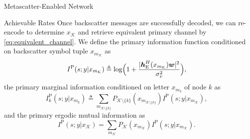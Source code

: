 \documentclass[journal]{IEEEtran}
\begin{document}
\begin{section}{Metascatter-Enabled Network}
\begin{subsection}{Achievable Rates}
		Once backscatter messages are successfully decoded, we can re-encode to determine $x_{\mathcal{K}}$ and retrieve equivalent primary channel by \eqref{eq:equivalent_channel}. We define the primary information function conditioned on backscatter symbol tuple $x_{m_{\mathcal{K}}}$ as
		\begin{equation}
			I^{\mathrm{P}}(s;y|x_{m_{\mathcal{K}}}) \triangleq \log \Bigl(1 + \frac{\lvert \boldsymbol{h}_{\mathrm{E}}^H(x_{m_{\mathcal{K}}}) \boldsymbol{w} \rvert^2}{\sigma_v^2}\Bigr),
			\label{eq:primary_information_function}
		\end{equation}
		the primary marginal information conditioned on letter $x_{m_k}$ of node $k$ as
		\begin{equation}
			I^{\mathrm{P}}_{k}(s;y|x_{m_k}) \triangleq \sum_{m_{\mathcal{K} \setminus \{k\}}} P_{\mathcal{K} \setminus \{k\}}(x_{m_{\mathcal{K} \setminus \{k\}}}) I^{\mathrm{P}}(s;y|x_{m_{\mathcal{K}}}),
			\label{eq:primary_marginal_information}
		\end{equation}
		and the primary ergodic mutual information as
		\begin{equation}
			I^{\mathrm{P}}(s;y|x_{\mathcal{K}}) = \sum_{m_{\mathcal{K}}} P_{\mathcal{K}}(x_{m_{\mathcal{K}}}) I^{\mathrm{P}}(s;y|x_{m_{\mathcal{K}}}).
			\label{eq:primary_mutual_information}
		\end{equation}


\end{subsection}
\end{section}
\end{document}
